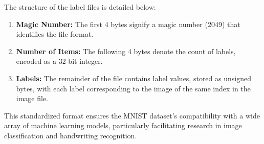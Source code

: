 The structure of the label files is detailed below:
\begin{enumerate}
    \item \textbf{Magic Number:} The first 4 bytes signify a magic number (2049) that identifies the file format.
    \item \textbf{Number of Items:} The following 4 bytes denote the count of labels, encoded as a 32-bit integer.
    \item \textbf{Labels:} The remainder of the file contains label values, stored as unsigned bytes, with each label corresponding to the image of the same index in the image file.
\end{enumerate}

This standardized format ensures the MNIST dataset's compatibility with a wide array of machine learning models, particularly facilitating research in image classification and handwriting recognition.

